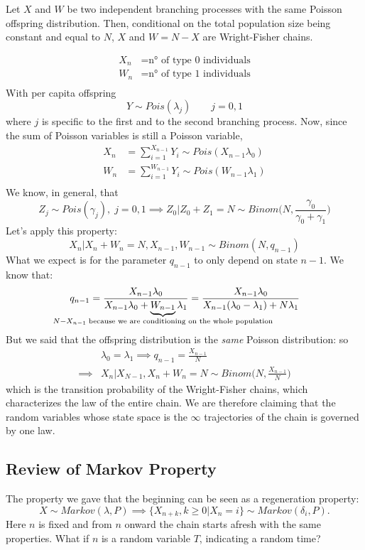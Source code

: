 \documentclass{article}
\begin{document}
\begin{proposition}
    Let $X$ and $W$ be two independent branching processes with the same Poisson offspring distribution. Then, conditional on the total population size being constant and equal to $N$, $X$ and $W=N-X$ are Wright-Fisher chains.
\end{proposition}
\begin{proof2}
    \begin{align*}
        X_n&=\text{n° of type 0 individuals}\\
        W_n&=\text{n° of type 1 individuals}\\
    \end{align*}
    With per capita offspring
    \[
    Y\sim Pois(\lambda_j) \qquad j=0,1
    \]
    where $j$ is specific to the first and to the second branching process. Now, since the sum of Poisson variables is still a Poisson variable,
    \begin{align*}
        X_n &= \sum_{i=1}^{X_{n-1}}Y_i \sim Pois(X_{n-1}\lambda_0)\\
        W_n &= \sum_{i=1}^{W_{n-1}}Y_i \sim Pois(W_{n-1}\lambda_1)\\
    \end{align*}
    We know, in general, that
    \[
    Z_j\sim Pois(\gamma_j),\;j=0,1 \implies Z_0|Z_0+Z_1=N\sim Binom\biggl(N,\frac{\gamma_0}{\gamma_0+\gamma_1}\biggr)
    \]
    Let's apply this property:
    \[
    X_n|X_n+W_n=N,X_{n-1},W_{n-1}\sim Binom(N,q_{n-1})
    \]
    What we expect is for the parameter $q_{n-1}$ to only depend on state $n-1$. We know that:
    \[
    q_{n-1}=\frac{X_{n-1}\lambda_0}{X_{n-1}\lambda_0+\underbrace{W_{n-1}}_{\mathclap{N-X_{n-1}\;\text{because we are conditioning on the whole population}}}\lambda_1}=\frac{X_{n-1}\lambda_0}{X_{n-1}(\lambda_0-\lambda_1)+N\lambda_1}
    \]
    But we said that the offspring distribution is the \textit{same} Poisson distribution: so
    \begin{align*}
        &\lambda_0=\lambda_1\implies q_{n-1}=\frac{X_{n-1}}{N}\\
        \implies &X_n|X_{N-1},X_n+W_n=N \sim Binom\biggl(N,\frac{X_{n-1}}{N}\biggr)
    \end{align*}
    which is the transition probability of the Wright-Fisher chains, which characterizes the law of the entire chain. We are therefore claiming that the random variables whose state space is the $\infty$ trajectories of the chain is governed by one law.
\end{proof2}
\subsection{Review of Markov Property}
The property we gave that the beginning can be seen as a regeneration property:
\[
X\sim Markov(\lambda,P) \implies \{X_{n+k},k\geqslant 0|X_n=i\}\sim Markov(\delta_i,P).
\] 
Here $n$ is fixed and from $n$ onward the chain starts afresh with the same properties. What if $n$ is a random variable $T$, indicating a random time?
\end{document}
